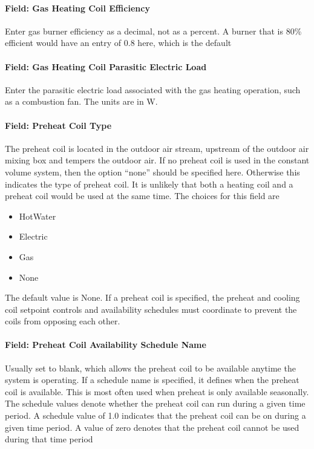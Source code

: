 \paragraph{Field: Gas Heating Coil Efficiency}\label{field-gas-heating-coil-efficiency-5}

Enter gas burner efficiency as a decimal, not as a percent. A burner that is 80\% efficient would have an entry of 0.8 here, which is the default

\paragraph{Field: Gas Heating Coil Parasitic Electric Load}\label{field-gas-heating-coil-parasitic-electric-load-5}

Enter the parasitic electric load associated with the gas heating operation, such as a combustion fan. The units are in W.

\paragraph{Field: Preheat Coil Type}\label{field-preheat-coil-type-1}

The preheat coil is located in the outdoor air stream, upstream of the outdoor air mixing box and tempers the outdoor air. If no preheat coil is used in the constant volume system, then the option ``none'' should be specified here. Otherwise this indicates the type of preheat coil. It is unlikely that both a heating coil and a preheat coil would be used at the same time. The choices for this field are

\begin{itemize}
\item
  HotWater
\item
  Electric
\item
  Gas
\item
  None
\end{itemize}

The default value is None. If a preheat coil is specified, the preheat and cooling coil setpoint controls and availability schedules must coordinate to prevent the coils from opposing each other.

\paragraph{Field: Preheat Coil Availability Schedule Name}\label{field-preheat-coil-availability-schedule-name-1}

Usually set to blank, which allows the preheat coil to be available anytime the system is operating. If a schedule name is specified, it defines when the preheat coil is available. This is most often used when preheat is only available seasonally. The schedule values denote whether the preheat coil can run during a given time period. A schedule value of 1.0 indicates that the preheat coil can be on during a given time period. A value of zero denotes that the preheat coil cannot be used during that time period

